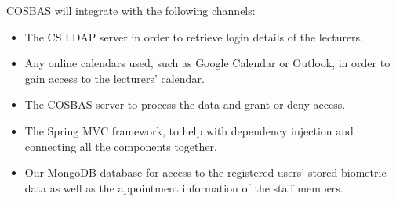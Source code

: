 COSBAS will integrate with the following channels:

\begin{itemize}
	\item The CS LDAP server in order to retrieve login details of the lecturers.
	\item Any online calendars used, such as Google Calendar or Outlook, in order to gain access to the lecturers' calendar.
	\item The COSBAS-server to process the data and grant or deny access.
	\item The Spring MVC framework, to help with dependency injection and connecting all the components together.
	\item Our MongoDB database for access to the registered users'  stored biometric data as well as the appointment information of the staff members. 
\end{itemize}